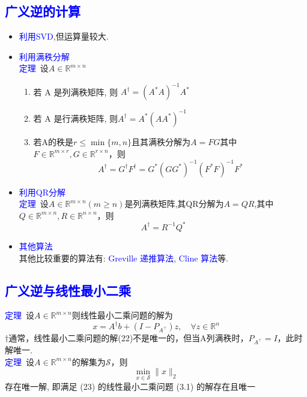 \documentclass[12pt,a4paper]{article}
\begin{document}
\subsection{\textcolor{blue}{广义逆的计算}}
\begin{itemize}
\item \textcolor{blue}{利用SVD},但运算量较大.
\item \textcolor{blue}{利用满秩分解}\\
\textcolor{blue}{定理}~设$A \in \mathbb{R}^{m \times n}$
\begin{enumerate}[(1)]
\item 若 A 是列满秩矩阵, 则 $A^{\dagger}=\left(A^{*} A\right)^{-1} A^{*}$
\item 若 A 是行满秩矩阵, 则$A^{\dagger}=A^{*}\left(A A^{*}\right)^{-1}$
\item 若A的秩是$r \leq \min \{m, n\}$且其满秩分解为$A=F G$其中$F \in \mathbb{R}^{m \times r}, G \in \mathbb{R}^{r \times n}$，则
$$
A^{\dagger}=G^{\dagger} F^{\dagger}=G^{*}\left(G G^{*}\right)^{-1}\left(F^{*} F\right)^{-1} F^{*}
$$
\end{enumerate}
\item \textcolor{blue}{利用QR分解}\\
\textcolor{blue}{定理}~设$A \in \mathbb{R}^{m \times n}(m \geq n)$是列满秩矩阵,其QR分解为$A=QR$,其中$Q \in \mathbb{R}^{m \times n}, R \in \mathbb{R}^{n \times n}$，则
$$
A^{\dagger}=R^{-1} Q^{*}
$$
\item \textcolor{blue}{其他算法}\\
其他比较重要的算法有: \textcolor{blue}{Greville 递推算法, Cline 算法}等.
\end{itemize}
\subsection{\textcolor{blue}{广义逆与线性最小二乘}}
\noindent \textcolor{blue}{定理}~设$A \in \mathbb{R}^{m \times n}$则线性最小二乘问题的解为
\begin{equation} 
x=A^{\dagger} b+\left(I-P_{A^{\top}}\right) z, \quad \forall z \in \mathbb{R}^{n}
\end{equation}
$\dagger$通常，线性最小二乘问题的解(22)不是唯一的，但当A列满秩时，$P_{A^{\top}}=I$，此时解唯一.\\
\textcolor{blue}{定理}~设$A \in \mathbb{R}^{m \times n}$的解集为$\mathcal{S}$，则
\begin{equation} 
\min _{x \in \mathcal{S}}\|x\|_{2}
\end{equation} 
存在唯一解, 即满足 (23) 的线性最小二乘问题 (3.1) 的解存在且唯一
\end{document}
